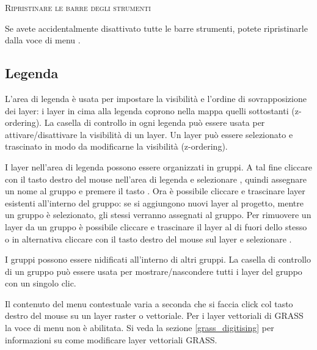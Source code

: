 \begin{Tip}
\caption{\textsc{Ripristinare le barre degli strumenti}} 
\qgistip
Se avete accidentalmente disattivato tutte le barre strumenti,
potete ripristinarle dalla voce di menu  \arrow {}.
\end{Tip}

\subsection{Legenda}\label{label_legend}

L'area di legenda è usata per impostare la visibilità  e l'ordine di sovrapposizione dei layer:
i layer in cima alla legenda coprono nella mappa quelli sottostanti (z-ordering).
La casella di controllo in ogni legenda può essere usata per attivare/disattivare la 
visibilità  di un layer.
Un layer può essere selezionato e trascinato in modo da modificarne la visibilità (z-ordering).

I layer nell'area di legenda possono essere organizzati in gruppi. A tal fine cliccare con il tasto destro del mouse nell'area di legenda e selezionare , quindi assegnare un nome al gruppo e premere il tasto 
. Ora è possibile cliccare e trascinare layer esistenti all'interno del gruppo: se si aggiungono nuovi layer al progetto, mentre un gruppo è selezionato, gli stessi verranno assegnati al gruppo. 
Per rimuovere un layer da un gruppo è possibile cliccare e trascinare il layer al di fuori dello stesso o in alternativa cliccare con il tasto destro del mouse sul layer e selezionare .

I gruppi possono essere nidificati all'interno di altri gruppi. La casella di controllo di un gruppo può essere usata per mostrare/nascondere tutti i layer del gruppo con un singolo clic.

Il contenuto del menu contestuale varia a seconda che si faccia click col tasto destro del mouse
su un layer raster o vettoriale. Per i layer vettoriali di GRASS la voce di menu 
non è abilitata. Si veda la sezione \ref{grass_digitising} per informazioni su come modificare layer vettoriali GRASS. 

